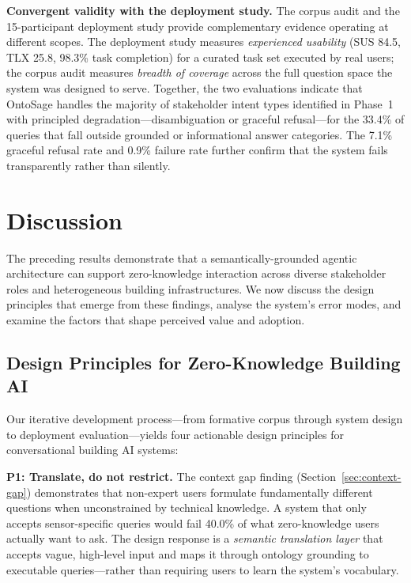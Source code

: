 \documentclass[acmsmall]{acmart}
\begin{document}
\textbf{Convergent validity with the deployment study.}
The corpus audit and the 15-participant deployment study provide complementary evidence operating at different scopes. The deployment study measures \emph{experienced usability} (SUS 84.5, TLX 25.8, 98.3\% task completion) for a curated task set executed by real users; the corpus audit measures \emph{breadth of coverage} across the full question space the system was designed to serve. Together, the two evaluations indicate that OntoSage handles the majority of stakeholder intent types identified in Phase~1 with principled degradation---disambiguation or graceful refusal---for the 33.4\% of queries that fall outside grounded or informational answer categories. The 7.1\% graceful refusal rate and 0.9\% failure rate further confirm that the system fails transparently rather than silently.


\section{Discussion}
\label{sec:discussion}

The preceding results demonstrate that a semantically-grounded agentic architecture can support zero-knowledge interaction across diverse stakeholder roles and heterogeneous building infrastructures. We now discuss the design principles that emerge from these findings, analyse the system's error modes, and examine the factors that shape perceived value and adoption.

\subsection{Design Principles for Zero-Knowledge Building AI}
\label{sec:design-principles}

Our iterative development process---from formative corpus through system design to deployment evaluation---yields four actionable design principles for conversational building AI systems:

\textbf{P1: Translate, do not restrict.} The context gap finding (Section~\ref{sec:context-gap}) demonstrates that non-expert users formulate fundamentally different questions when unconstrained by technical knowledge. A system that only accepts sensor-specific queries would fail 40.0\% of what zero-knowledge users actually want to ask. The design response is a \emph{semantic translation layer} that accepts vague, high-level input and maps it through ontology grounding to executable queries---rather than requiring users to learn the system's vocabulary.
\end{document}
